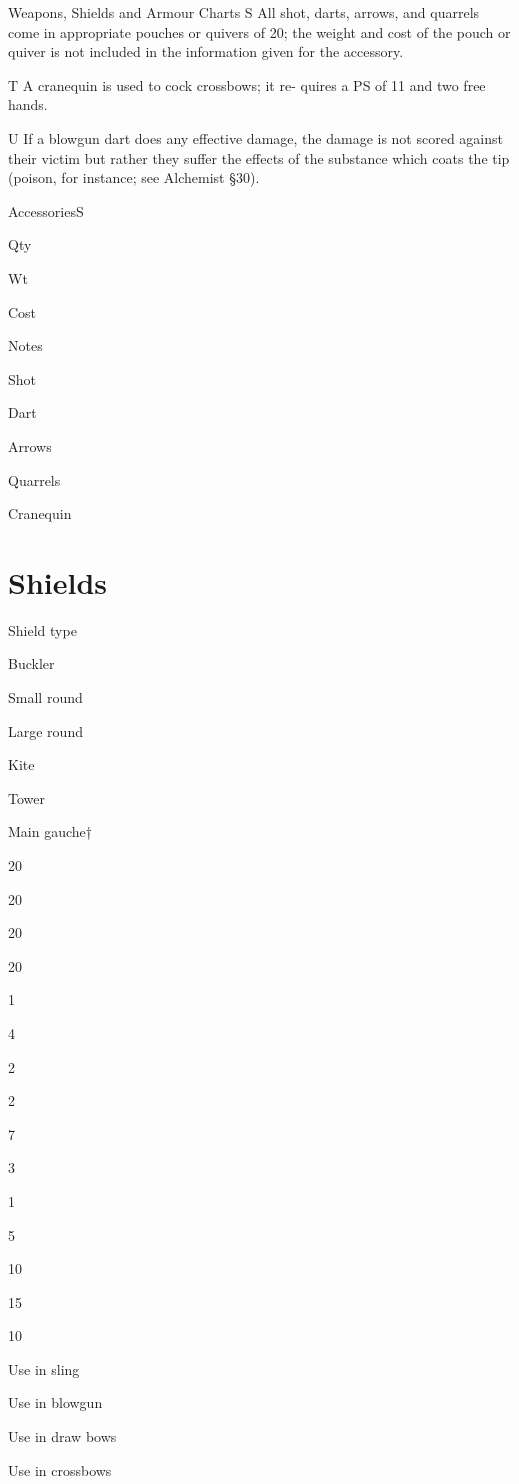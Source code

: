 \begin{Table}{Weapons, Shields and Armour Charts}
S All shot, darts, arrows, and quarrels come in appropriate pouches or
quivers of 20; the weight and cost of the pouch or quiver is not
included in the information given for the accessory.

T A cranequin is used to cock crossbows; it re- quires a PS of 11 and
two free hands.

U If a blowgun dart does any effective damage, the damage is not
scored against their victim but rather they suffer the effects of the
substance which coats the tip (poison, for instance; see Alchemist
§30).

AccessoriesS 

Qty 

Wt 

Cost 

Notes 

Shot 

Dart 

Arrows 

Quarrels 

Cranequin 

 

\section{Shields}

Shield type 

Buckler 

Small round 

Large round 

Kite 

Tower 

Main gauche† 

20 

20 

20 

20 

1 

4 

2 

2 

7 

3 

1 

5 

10 

15 

10 

Use in sling 

Use in blowgun 

Use in draw bows 

Use in crossbows 


\end{Table}
